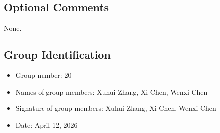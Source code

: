 \documentclass{article}
\begin{document}
\subsection*{Optional Comments}
None.

\subsection*{Group Identification}

\begin{itemize}
	\item Group number: 20
	\item Names of group members: Xuhui Zhang, Xi Chen, Wenxi Chen
	\item Signature of group members: Xuhui Zhang, Xi Chen, Wenxi Chen
	\item Date: April 12, 2026
\end{itemize}
\end{document}
